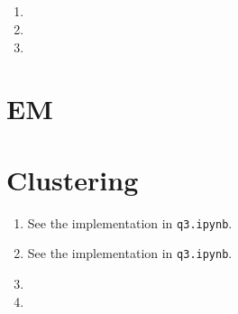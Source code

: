 \documentclass[paper=letter, fontsize=12pt]{article}
\begin{document}
\subsection{}

\begin{enumerate}[label=(\alph*)]
	\item 
	
	\item 
	
	\item 
\end{enumerate}

\section{EM}

\section{Clustering}
\begin{enumerate}[label=(\alph*)]
	\item See the implementation in \verb|q3.ipynb|.
	
	\item See the implementation in \verb|q3.ipynb|.
	
	\item 
	
	\item
\end{enumerate}
\end{document}
